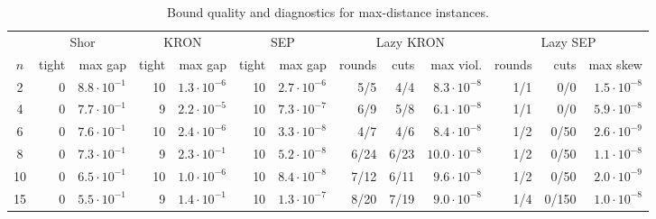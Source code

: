 \documentclass[11pt]{article}
\begin{document}
\begin{table}[htbp]
\centering
\caption{Bound quality and diagnostics for max-distance instances.}
\label{tab:maxdist_diagnostics}
\begingroup
\setlength{\tabcolsep}{1.6pt}
\tiny
\begin{tabular}{c|r r|r r|r r|r r r|r r r}
\hline
& \multicolumn{2}{c|}{Shor} & \multicolumn{2}{c|}{KRON} & \multicolumn{2}{c|}{SEP} & \multicolumn{3}{c|}{Lazy KRON} & \multicolumn{3}{c}{Lazy SEP} \\
$n$ & tight & max gap & tight & max gap & tight & max gap & rounds & cuts & max viol. & rounds & cuts & max skew \\
\hline
2 & 0 & $8.8\cdot 10^{-1}$ & 10 & $1.3\cdot 10^{-6}$ & 10 & $2.7\cdot 10^{-6}$ & 5/5 & 4/4 & $8.3\cdot 10^{-8}$ & 1/1 & 0/0 & $1.5\cdot 10^{-8}$ \\
4 & 0 & $7.7\cdot 10^{-1}$ & 9 & $2.2\cdot 10^{-5}$ & 10 & $7.3\cdot 10^{-7}$ & 6/9 & 5/8 & $6.1\cdot 10^{-8}$ & 1/1 & 0/0 & $5.9\cdot 10^{-8}$ \\
6 & 0 & $7.6\cdot 10^{-1}$ & 10 & $2.4\cdot 10^{-6}$ & 10 & $3.3\cdot 10^{-8}$ & 4/7 & 4/6 & $8.4\cdot 10^{-8}$ & 1/2 & 0/50 & $2.6\cdot 10^{-9}$ \\
8 & 0 & $7.3\cdot 10^{-1}$ & 9 & $2.3\cdot 10^{-1}$ & 10 & $5.2\cdot 10^{-8}$ & 6/24 & 6/23 & $10.0\cdot 10^{-8}$ & 1/2 & 0/50 & $1.1\cdot 10^{-8}$ \\
10 & 0 & $6.5\cdot 10^{-1}$ & 10 & $1.0\cdot 10^{-6}$ & 10 & $8.4\cdot 10^{-8}$ & 7/12 & 6/11 & $9.6\cdot 10^{-8}$ & 1/2 & 0/50 & $2.0\cdot 10^{-9}$ \\
15 & 0 & $5.5\cdot 10^{-1}$ & 9 & $1.4\cdot 10^{-1}$ & 10 & $1.3\cdot 10^{-7}$ & 8/20 & 7/19 & $9.0\cdot 10^{-8}$ & 1/4 & 0/150 & $1.0\cdot 10^{-8}$ \\
\hline
\hline
\end{tabular}
\endgroup
\end{table}
\end{document}
